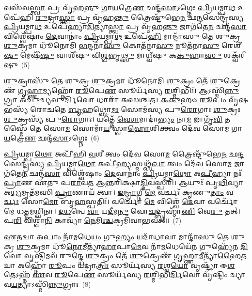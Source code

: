 {\anuvakamend[{\-\ul{𑌶}\-\-\ul{𑍞}\-\-\ul{𑌸𑌿}\-\-\ul{𑌷}\-𑌦𑍍𑌵𑌿𑌶𑍍𑌵𑍇᳴ \ul{𑌦𑍇}\-𑌵𑌾 \ul{𑌅}\-𑌷𑍍𑌟𑌾𑌵𑌿𑍞᳴𑌶𑌤𑌿𑌶𑍍𑌚}]}%

𑌵𑌸᳴𑌵\-\ul{𑌸𑍍𑌤𑍍𑌵𑌾} 𑌪𑍍𑌰 𑌵𑍃᳴𑌹𑌨𑍍𑌤𑍁 𑌗𑌾\-\ul{𑌯}\-𑌤𑍍𑌰𑍇\-\ul{𑌣} 𑌛𑌨𑍍𑌦᳴\-\ul{𑌸𑌾}\-\-𑌽𑌗𑍍𑌨𑍇𑌃 \ul{𑌪𑍍𑌰𑌿}\-𑌯𑌮𑍍𑌪𑌾\-\ul{𑌥} 𑌉𑌪𑍇᳴𑌹𑌿 \ul{𑌰𑍁}\-𑌦𑍍𑌰𑌾\-\ul{𑌸𑍍𑌤𑍍𑌵𑌾} 𑌪𑍍𑌰 𑌵𑍃᳴𑌹\-\ul{𑌨𑍍𑌤𑍁} 𑌤𑍍𑌰𑍈𑌷𑍍𑌟𑍁᳴𑌭𑍇\-\ul{𑌨} 𑌛\-\ul{𑌨𑍍𑌦}\-𑌸𑍇𑌨𑍍𑌦𑍍𑌰᳴𑌸𑍍𑌯 \ul{𑌪𑍍𑌰𑌿}\-𑌯𑌮𑍍𑌪𑌾\-\ul{𑌥} 𑌉𑌪𑍇॑𑌹𑍍𑌯𑌾\-\ul{𑌦𑌿}\-𑌤𑍍𑌯𑌾\-\ul{𑌸𑍍𑌤𑍍𑌵𑌾} 𑌪𑍍𑌰 𑌵𑍃᳴𑌹\-\ul{𑌨𑍍𑌤𑍁} 𑌜𑌾𑌗᳴𑌤𑍇\-\ul{𑌨} 𑌛𑌨𑍍𑌦᳴\-\ul{𑌸𑌾} 𑌵𑌿𑌶𑍍𑌵𑍇᳴𑌷𑌾𑌂 \ul{𑌦𑍇}\-𑌵𑌾𑌨𑌾𑌂॑ \ul{𑌪𑍍𑌰𑌿}\-𑌯𑌮𑍍𑌪𑌾\-\ul{𑌥} 𑌉𑌪𑍇᳴\-\ul{𑌹𑌿} 𑌮𑌾𑌨𑍍𑌦𑌾᳴𑌸𑍁 𑌤𑍇 𑌶𑍁𑌕𑍍𑌰 \ul{𑌶𑍁}\-𑌕𑍍𑌰𑌮𑌾 𑌧𑍂᳴𑌨𑍋𑌮𑌿 \ul{𑌭}\-𑌨𑍍𑌦𑌨𑌾᳴\-\ul{𑌸𑍁} 𑌕𑍋𑌤᳴𑌨𑌾\-\ul{𑌸𑍁} 𑌨𑍂𑌤᳴𑌨𑌾\-\ul{𑌸𑍁} 𑌰𑍇𑌶𑍀᳴\-\ul{𑌷𑍁} 𑌮𑍇𑌷𑍀᳴\-\ul{𑌷𑍁} 𑌵𑌾𑌶𑍀᳴𑌷𑍁 𑌵𑌿\-\ul{𑌶𑍍𑌵}\-𑌭𑍃\-\ul{𑌥𑍍𑌸𑍁} 𑌮𑌾𑌧𑍍𑌵𑍀᳴𑌷𑍁 𑌕\-\ul{𑌕𑍁}\-𑌹𑌾\-\ul{𑌸𑍁} 𑌶𑌕𑍍𑌵᳴𑌰𑍀𑌷𑍁~(5)

\-\ul{𑌶𑍁}\-𑌕𑍍𑌰𑌾𑌸𑍁᳴ 𑌤𑍇 𑌶𑍁𑌕𑍍𑌰 \ul{𑌶𑍁}\-𑌕𑍍𑌰𑌮𑌾 𑌧𑍂᳴𑌨𑍋𑌮𑌿 \ul{𑌶𑍁}\-𑌕𑍍𑌰𑌂 𑌤𑍇᳴ \ul{𑌶𑍁}\-𑌕𑍍𑌰𑍇𑌣᳴ 𑌗𑍃\-\ul{𑌹𑍍𑌣𑌾}\-𑌮𑍍𑌯𑌹𑍍𑌨𑍋᳴ \ul{𑌰𑍂}\-𑌪𑍇\-\ul{𑌣} 𑌸𑍂𑌰𑍍𑌯᳴𑌸𑍍𑌯 \ul{𑌰}\-𑌶𑍍𑌮𑌿𑌭𑌿𑌃᳴। 𑌆\-𑌽𑌸𑍍𑌮𑌿᳴\-\ul{𑌨𑍍𑌨𑍁}\-𑌗𑍍𑌰𑌾 𑌅᳴𑌚𑍁𑌚𑍍𑌯𑌵𑍁\-\ul{𑌰𑍍𑌦𑌿}\-𑌵𑍋 𑌧𑌾𑌰𑌾᳴ 𑌅𑌸𑌶𑍍𑌚𑌤। \ul{𑌕}\-\-\ul{𑌕𑍁}\-𑌹𑍞 \ul{𑌰𑍂}\-𑌪𑌂 𑌵𑍃᳴\-\ul{𑌷}\-𑌭𑌸𑍍𑌯᳴ 𑌰𑍋𑌚𑌤𑍇 \ul{𑌬𑍃}\-𑌹𑌥𑍍𑌸𑍋\-\ul{𑌮𑌃} 𑌸𑍋𑌮᳴𑌸𑍍𑌯 𑌪𑍁\-\ul{𑌰𑍋}\-𑌗𑌾𑌃 \ul{𑌶𑍁}\-𑌕𑍍𑌰𑌃 \ul{𑌶𑍁}\-𑌕𑍍𑌰𑌸𑍍𑌯᳴ 𑌪𑍁\-\ul{𑌰𑍋}\-𑌗𑌾𑌃। 𑌯𑌤𑍍𑌤𑍇᳴ \ul{𑌸𑍋}\-𑌮𑌾𑌦𑌾॑\-\ul{𑌭𑍍𑌯𑌂} 𑌨𑌾\-\ul{𑌮} 𑌜𑌾𑌗𑍃᳴\-\ul{𑌵𑌿} 𑌤𑌸𑍍𑌮𑍈᳴ 𑌤𑍇 𑌸𑍋\-\ul{𑌮} 𑌸𑍋𑌮𑌾᳴\-\ul{𑌯} 𑌸𑍍𑌵𑌾\-\ul{𑌹𑍋}\-𑌶𑌿𑌕𑍍𑌤𑍍𑌵𑌂 𑌦𑍇᳴𑌵 𑌸𑍋𑌮 𑌗𑌾\-\ul{𑌯}\-𑌤𑍍𑌰𑍇\-\ul{𑌣} 𑌛𑌨𑍍𑌦᳴\-\ul{𑌸𑌾}\-\-𑌽𑌗𑍍𑌨𑍇𑌃~(6)

\-\ul{𑌪𑍍𑌰𑌿}\-𑌯𑌮𑍍𑌪𑌾\-\ul{𑌥𑍋} 𑌅𑌪𑍀᳴𑌹𑌿 \ul{𑌵}\-𑌶𑍀 𑌤𑍍𑌵𑌂 𑌦𑍇᳴𑌵 𑌸𑍋\-\ul{𑌮} 𑌤𑍍𑌰𑍈𑌷𑍍𑌟𑍁᳴𑌭𑍇\-\ul{𑌨} 𑌛\-\ul{𑌨𑍍𑌦}\-𑌸𑍇𑌨𑍍𑌦𑍍𑌰᳴𑌸𑍍𑌯 \ul{𑌪𑍍𑌰𑌿}\-𑌯𑌮𑍍𑌪𑌾\-\ul{𑌥𑍋} 𑌅𑌪𑍀॑\-\ul{𑌹𑍍𑌯}\-𑌸𑍍𑌮𑌥𑍍𑌸᳴\-\ul{𑌖𑌾} 𑌤𑍍𑌵𑌂 𑌦𑍇᳴𑌵 𑌸𑍋\-\ul{𑌮} 𑌜𑌾𑌗᳴𑌤𑍇\-\ul{𑌨} 𑌛𑌨𑍍𑌦᳴\-\ul{𑌸𑌾} 𑌵𑌿𑌶𑍍𑌵𑍇᳴𑌷𑌾𑌂 \ul{𑌦𑍇}\-𑌵𑌾𑌨𑌾𑌂॑ \ul{𑌪𑍍𑌰𑌿}\-𑌯𑌮𑍍𑌪𑌾\-\ul{𑌥𑍋} 𑌅\-\ul{𑌪𑍀}\-𑌹𑍍𑌯𑌾 𑌨𑌃᳴ \ul{𑌪𑍍𑌰𑌾}\-𑌣 𑌏᳴𑌤𑍁 𑌪\-\ul{𑌰𑌾}\-𑌵\-\ul{𑌤} 𑌆𑌨𑍍𑌤𑌰𑌿᳴𑌕𑍍𑌷𑌾\-\ul{𑌦𑍍𑌦𑌿}\-𑌵𑌸𑍍𑌪𑌰𑌿᳴। 𑌆𑌯𑍁𑌃᳴ 𑌪𑍃\-\ul{𑌥𑌿}\-𑌵𑍍𑌯𑌾 𑌅\-\ul{𑌧𑍍𑌯}\-𑌮𑍃𑌤᳴𑌮𑌸𑌿 \ul{𑌪𑍍𑌰𑌾}\-𑌣𑌾𑌯᳴ 𑌤𑍍𑌵𑌾। \ul{𑌇}\-\-\ul{𑌨𑍍𑌦𑍍𑌰𑌾}\-𑌗𑍍𑌨𑍀 \ul{𑌮𑍇} 𑌵𑌰𑍍𑌚𑌃᳴ 𑌕𑍃𑌣𑍁\-\ul{𑌤𑌾𑌂} 𑌵\-\ul{𑌰𑍍𑌚𑌃} 𑌸𑍋\-\ul{𑌮𑍋} 𑌬𑍃\-\ul{𑌹}\-𑌸𑍍𑌪𑌤𑌿𑌃᳴। 𑌵𑌰𑍍𑌚𑍋᳴ \ul{𑌮𑍇} 𑌵𑌿𑌶𑍍𑌵𑍇᳴ \ul{𑌦𑍇}\-𑌵𑌾 𑌵𑌰𑍍𑌚𑍋᳴ 𑌮𑍇 𑌧𑌤𑍍𑌤𑌮𑌶𑍍𑌵𑌿𑌨𑌾। \ul{𑌦}\-\-\ul{𑌧}\-𑌨𑍍𑌵𑍇 \ul{𑌵𑌾} 𑌯\-\ul{𑌦𑍀}\-𑌮\-\ul{𑌨𑍁} 𑌵𑍋\-\ul{𑌚}\-𑌦𑍍𑌬𑍍𑌰𑌹𑍍𑌮𑌾᳴\-\ul{𑌣𑌿} 𑌵𑍇\-\ul{𑌰𑍁} 𑌤𑌤𑍍। 𑌪\-\ul{𑌰𑌿} 𑌵𑌿𑌶𑍍𑌵𑌾᳴\-\ul{𑌨𑌿} 𑌕𑌾𑌵𑍍𑌯𑌾᳴ \ul{𑌨𑍇}\-𑌮𑌿\-\ul{𑌶𑍍𑌚}\-𑌕𑍍𑌰𑌮𑌿᳴𑌵𑌾𑌭𑌵𑌤𑍍॥~(7)

{\anuvakamend[{𑌶𑌕𑍍𑌵᳴𑌰𑍀\-\ul{𑌷𑍍𑌵}\-𑌗𑍍𑌨𑍇𑌰𑍍𑌬𑍃\-\ul{𑌹}\-𑌸𑍍𑌪\-\ul{𑌤𑌿𑌃} 𑌪𑌞𑍍𑌚᳴𑌵𑌿𑍞𑌶𑌤𑌿𑌶𑍍𑌚}]}%

\-\ul{𑌏}\-𑌤𑌦𑍍𑌵𑌾 \ul{𑌅}\-𑌪𑌾𑌂 𑌨𑌾᳴\-\ul{𑌮}\-𑌧𑍇\-\ul{𑌯𑌂} 𑌗𑍁\-\ul{𑌹𑍍𑌯𑌂} 𑌯𑌦𑌾᳴\-\ul{𑌧𑌾}\-𑌵𑌾 𑌮𑌾𑌨𑍍𑌦𑌾᳴𑌸𑍁 𑌤𑍇 𑌶𑍁𑌕𑍍𑌰 \ul{𑌶𑍁}\-𑌕𑍍𑌰𑌮𑌾 𑌧𑍂᳴\-\ul{𑌨𑍋}\-𑌮𑍀𑌤𑍍𑌯𑌾᳴\-\ul{𑌹𑌾}\-𑌪𑌾\-\ul{𑌮𑍇}\-𑌵 𑌨𑌾᳴\-\ul{𑌮}\-𑌧𑍇𑌯𑍇᳴\-\ul{𑌨} 𑌗𑍁𑌹𑍍𑌯𑍇᳴𑌨 \ul{𑌦𑌿}\-𑌵𑍋 𑌵𑍃\-\ul{𑌷𑍍𑌟𑌿}\-𑌮𑌵᳴ 𑌰𑍁𑌨𑍍𑌦𑍍𑌧𑍇 \ul{𑌶𑍁}\-𑌕𑍍𑌰𑌂 𑌤𑍇᳴ \ul{𑌶𑍁}\-𑌕𑍍𑌰𑍇𑌣᳴ 𑌗𑍃\-\ul{𑌹𑍍𑌣𑌾}\-𑌮𑍀𑌤𑍍𑌯𑌾᳴\-\ul{𑌹𑍈}\-𑌤𑌦𑍍𑌵𑌾 𑌅𑌹𑍍𑌨𑍋᳴ \ul{𑌰𑍂}\-𑌪𑌂 𑌯𑌦𑍍𑌰𑌾\-\ul{𑌤𑍍𑌰𑌿𑌃} 𑌸𑍂𑌰𑍍𑌯᳴𑌸𑍍𑌯 \ul{𑌰}\-𑌶𑍍𑌮\-\ul{𑌯𑍋} 𑌵𑍃𑌷𑍍𑌟𑍍𑌯𑌾᳴ 𑌈\-\ul{𑌶}\-𑌤𑍇\-𑌽𑌹𑍍𑌨᳴ \ul{𑌏}\-𑌵 \ul{𑌰𑍂}\-𑌪𑍇\-\ul{𑌣} 𑌸𑍂𑌰𑍍𑌯᳴𑌸𑍍𑌯 \ul{𑌰}\-𑌶𑍍𑌮𑌿𑌭𑌿᳴\-\ul{𑌰𑍍𑌦𑌿}\-𑌵𑍋 𑌵𑍃᳴𑌷𑍍𑌟𑌿𑌂 𑌚𑍍𑌯𑌾𑌵\-\ul{𑌯}\-𑌤𑍍𑌯𑌾\-𑌽𑌸𑍍𑌮𑌿᳴\-\ul{𑌨𑍍𑌨𑍁}\-𑌗𑍍𑌰𑌾𑌃~(8)

